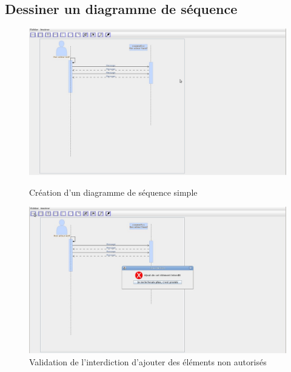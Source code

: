 \documentclass[12pt,a4paper,openany]{report}
\begin{document}
		\subsection{Dessiner un diagramme de séquence}
		\begin{figure}[H]
			\centering
			\includegraphics[width=18cm]{validation5.jpg}
			\caption{Création d'un diagramme de séquence simple}
			\includegraphics[width=18cm]{validation6.jpg}
			\caption{Validation de l'interdiction d'ajouter des éléments non autorisés}
		\end{figure}
		\newpage
\end{document}
